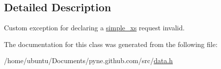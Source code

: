 \subsection{Detailed Description}
Custom exception for declaring a \hyperlink{structsimple__xs}{simple\+\_\+xs} request invalid. 

The documentation for this class was generated from the following file\+:\begin{DoxyCompactItemize}
\item 
/home/ubuntu/\+Documents/pyne.\+github.\+com/src/\hyperlink{data_8h}{data.\+h}\end{DoxyCompactItemize}
